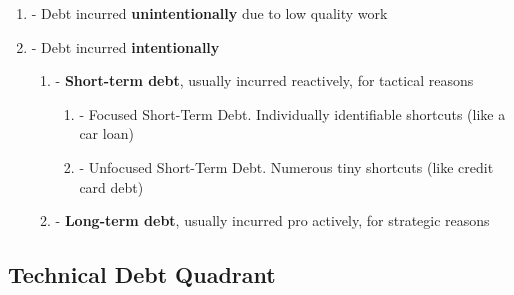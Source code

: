 \begin{enumerate}
    \item - Debt incurred \textbf{unintentionally} due to low quality work
    \item - Debt incurred \textbf{intentionally}
    \begin{enumerate}
        \item - \textbf{Short-term debt}, usually incurred reactively, for tactical reasons
        \begin{enumerate}
            \item - Focused Short-Term Debt. Individually identifiable shortcuts (like a car loan)
            \item - Unfocused Short-Term Debt. Numerous tiny shortcuts (like credit card debt)
        \end{enumerate}
        \item - \textbf{Long-term debt}, usually incurred pro actively, for strategic reasons
    \end{enumerate}
\end{enumerate}

\subsection{Technical Debt Quadrant}
